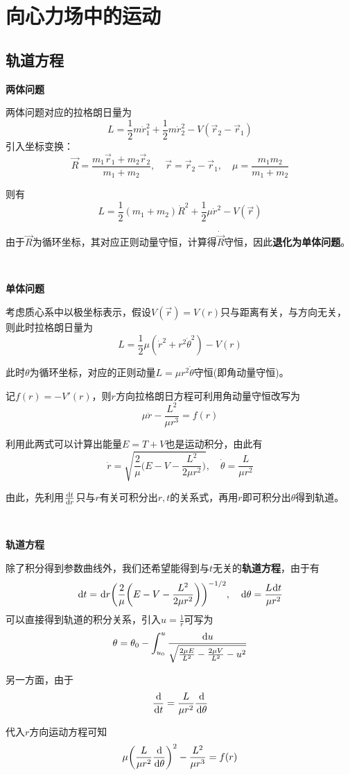 \documentclass[a4paper,UTF8,fontset=windows]{ctexart}
\newcommand*{\dr}{\hspace{0.07em}\mathrm{d}}
\begin{document}
\section{向心力场中的运动}
\subsection{轨道方程}
\textbf{两体问题}

两体问题对应的拉格朗日量为
$$L=\frac{1}{2}m\dot{r}_1^2+\frac{1}{2}m\dot{r}_2^2-V(\vec{r}_2-\vec{r}_1)$$
引入坐标变换：
$$\vec{R}=\frac{m_1\vec{r}_1+m_2\vec{r}_2}{m_1+m_2},\quad\vec{r}=\vec{r}_2-\vec{r}_1,\quad \mu=\frac{m_1m_2}{m_1+m_2}$$

则有
$$L=\frac{1}{2}(m_1+m_2)\dot{R}^2+\frac{1}{2}\mu\dot{r}^2-V(\vec{r})$$

由于$\vec{R}$为循环坐标，其对应正则动量守恒，计算得$\dot{\vec{R}}$守恒，因此\textbf{退化为单体问题}。

\

\textbf{单体问题}

考虑质心系中以极坐标表示，假设$V(\vec{r})=V(r)$只与距离有关，与方向无关，则此时拉格朗日量为
$$L=\frac{1}{2}\mu(\dot{r}^2+r^2\dot{\theta}^2)-V(r)$$

此时$\theta$为循环坐标，对应的正则动量$L=\mu r^2\dot{\theta}$守恒(即角动量守恒)。

记$f(r)=-V'(r)$，则$r$方向拉格朗日方程可利用角动量守恒改写为
$$\mu\ddot{r}-\frac{L^2}{\mu r^3}=f(r)$$

利用此两式可以计算出能量$E=T+V$也是运动积分，由此有
$$\dot{r}=\sqrt{\frac{2}{\mu}\bigg(E-V-\frac{L^2}{2\mu r^2}\bigg)},\quad\dot{\theta}=\frac{L}{\mu r^2}$$

由此，先利用$\frac{\dr t}{\dr r}$只与$r$有关可积分出$r,t$的关系式，再用$r$即可积分出$\theta$得到轨道。

\

\textbf{轨道方程}

除了积分得到参数曲线外，我们还希望能得到与$t$无关的\textbf{轨道方程}，由于有
$$\dr t=\dr r\bigg(\frac{2}{\mu}\bigg(E-V-\frac{L^2}{2\mu r^2}\bigg)\bigg)^{-1/2},\quad\dr\theta=\frac{L\dr t}{\mu r^2}$$
可以直接得到轨道的积分关系，引入$u=\frac{1}{r}$可写为
$$\theta=\theta_0-\int_{u_0}^u\frac{\dr u}{\sqrt{\frac{2\mu E}{L^2}-\frac{2\mu V}{L^2}-u^2}}$$

另一方面，由于
$$\frac{\dr}{\dr t}=\frac{L}{\mu r^2}\frac{\dr}{\dr\theta}$$

代入$r$方向运动方程可知
$$\mu\bigg(\frac{L}{\mu r^2}\frac{\dr}{\dr\theta}\bigg)^2-\frac{L^2}{\mu r^3}=f(r)$$
\end{document}
